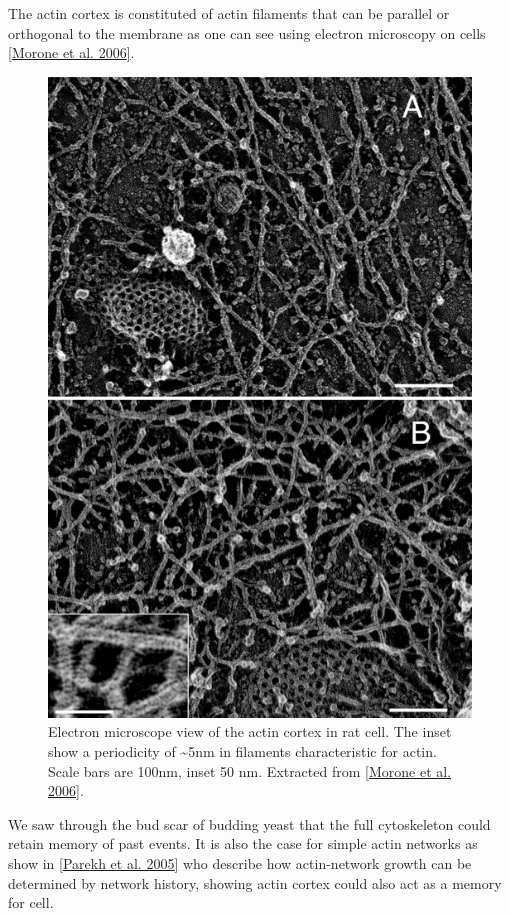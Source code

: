 \documentclass[A4paperpaper,11pt,english]{sphinxmanual}
\begin{document}
The actin cortex is constituted of actin filaments that can be parallel or
orthogonal to the membrane as one can see using electron microscopy on cells
{\hyperref[index-latex:morone2006b]{{[}Morone et al. 2006{]}}}.
\begin{figure}[htbp]
\centering
\capstart

\includegraphics[width=0.700\linewidth]{Actin-Cortex-Moronne-2006.jpg}
\caption{Electron microscope view of the actin cortex in rat cell. The inset
show a periodicity of \textasciitilde{}5nm in filaments characteristic for actin.  Scale
bars are 100nm, inset 50 nm. Extracted from {\hyperref[index-latex:morone2006b]{{[}Morone et al. 2006{]}}}.}\label{index-latex:fig-electro-cortex}\end{figure}

We saw through the bud scar of budding yeast that the full cytoskeleton could
retain memory of past events. It is also the case for simple actin networks as
show in {\hyperref[index-latex:parekh2005]{{[}Parekh et al. 2005{]}}} who describe how actin-network growth can be
determined by network history, showing actin cortex could also act as a memory
for cell.
\end{document}
